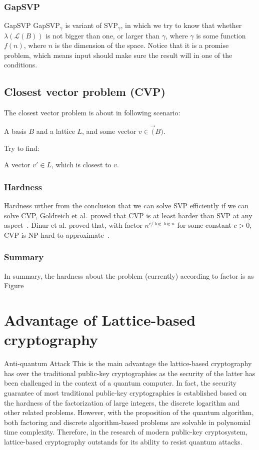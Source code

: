\documentclass{beamer}
\begin{document}
	\subsubsection{GapSVP}%
	\begin{frame}{GapSVP}
		GapSVP$_\gamma$ is variant of SVP$_\gamma$, in which we try to know that whether $\lambda(\mathcal{L}(B))$ is not bigger than one, or larger than $\gamma$, where $\gamma$ is some function $f(n)$, where $n$ is the dimension of the space. Notice that it is a promise problem, which means input should make sure the result will in one of the conditions.
	\end{frame}
	\subsection{Closest vector problem (CVP)}%
	\begin{frame}
		The closest vector problem is about in following scenario:
		
		A basis $B$ and a lattice $L$, and some vector $v\in \vec(B)$.
		
		Try to find:
		
		A vector $v'\in L$, which is closest to $v$.
	\end{frame}
	
	\subsubsection{Hardness}
	\begin{frame}{Hardness}
		urther from the conclusion that we can solve SVP efficiently if we can solve CVP, Goldreich et al.\ proved that CVP is at least harder than SVP at any aspect~\cite{RN3}. Dinur et al. proved that, with factor $n^{c/\log{\log{n}}}$ for some constant $c>0$, CVP is NP-hard to approximate~\cite{GMSS99}.
	\end{frame}
	\subsubsection{Summary}
	In summary, the hardness about the problem (currently) according to factor is as Figure
	\section{Advantage of Lattice-based cryptography}
	\begin{frame}{Anti-quantum Attack}
		This is the main advantage the lattice-based cryptography has over the traditional public-key cryptographies as the security of the latter has been challenged in the context of a quantum computer. In fact, the security guarantee of most traditional public-key cryptographies is established based on the hardness of the factorization of large integers, the discrete logarithm and other related problems. However, with the proposition of the quantum algorithm, both factoring and discrete algorithm-based problems are solvable in polynomial time complexity. Therefore, in the research of modern public-key cryptosystem, lattice-based cryptography outstands for its ability to resist quantum attacks.
	\end{frame}
\end{document}
